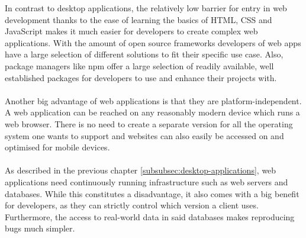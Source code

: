 
In contrast to desktop applications, the relatively low barrier for entry in web development thanks to the ease of learning
the basics of HTML, CSS and JavaScript makes it much easier for developers to create complex web applications. 
With the amount of open source frameworks developers of web apps have a large selection of different solutions to fit
their specific use case.
Also, package managers like \acrfull{npm} offer a large selection of readily available, well established packages for developers to use
and enhance their projects with.\paragraph{}
Another big advantage of web applications is that they are platform-independent. 
A web application can be reached on any reasonably modern device which runs a web browser.
There is no need to create a separate version for all the operating system one wants to support and 
websites can also easily be accessed on and optimised for mobile devices.\paragraph{}
As described in the previous chapter \ref{subsubsec:desktop-applications}, web applications need continuously running infrastructure such as
web servers and databases. 
While this constitutes a disadvantage, it also comes with a big benefit for developers, as they can strictly control which version 
a client uses.
Furthermore, the access to real-world data in said databases makes reproducing bugs much simpler. \parencite{jacobs2005}